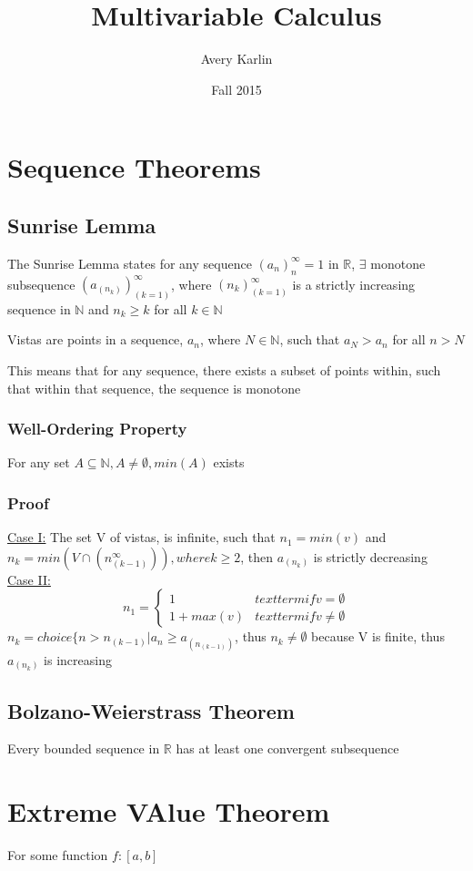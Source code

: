 \documentclass[11 pt, twoside]{article}
\begin{document}
\title{Multivariable Calculus}
\author{Avery Karlin}
\date{Fall 2015}

\maketitle
\newpage
\tableofcontents
\newpage



\section{Sequence Theorems}
\subsection{Sunrise Lemma}
The Sunrise Lemma states for any sequence $(a_n)^\infty_n=1$ in $\mathbb{R}$, $\exists$ monotone subsequence $(a_(n_k))^\infty_(k=1)$, where $(n_k)^\infty_(k=1)$ is a strictly increasing sequence in $\mathbb{N}$ and $n_k \geq k$ for all $k \in \mathbb{N}$

Vistas are points in a sequence, $a_n$, where  $N \in \mathbb{N}$, such that $a_N > a_n$ for all $n > N$

This means that for any sequence, there exists a subset of points within, such that within that sequence, the sequence is monotone

\subsubsection{Well-Ordering Property}
For any set $A \subseteq \mathbb{N}, A \neq \emptyset, min(A)$ exists

\subsubsection{Proof}
\underline{Case I:} The set V of vistas, is infinite, such that $n_1 = min(v)$ and $n_k = min(V \cap (n_(k-1)^\infty)), where k \geq 2$, then $a_(n_k)$ is strictly decreasing\\
\underline{Case II:}
\[ n_1 =
\begin{cases}
1 & textterm{if v = \emptyset} \\
1 + max(v) & textterm{if v \neq \emptyset}
\end{cases} \]
$n_k = choice\{n > n_(k-1) | a_n \geq a_(n_(k-1))$, thus $n_k \neq \emptyset$ because V is finite, thus $a_(n_k)$ is increasing

\subsection{Bolzano-Weierstrass Theorem}
Every bounded sequence in $\mathbb{R}$ has at least one convergent subsequence

\section{Extreme VAlue Theorem}
For some function $f:[a, b]$ 
\end{document}
